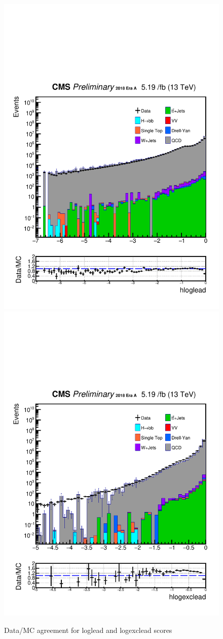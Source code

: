\begin{figure}[h!]
  \label{fig:DataMCscore}
  \centering
  \includegraphics[width=0.67\linewidth]{figs/Data_log_Oct6ANVars_MS-15_ctauS-10_hloglead.pdf}
  \includegraphics[width=0.67\linewidth]{figs/Data_log_Oct6ANVars_MS-15_ctauS-10_hlogexclead.pdf}
  \caption{Data/MC agreement for loglead and logexclead scores}
\end{figure}

